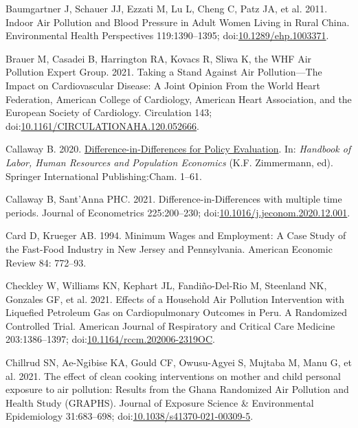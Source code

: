 \documentclass[
  letterpaper,
  DIV=11,
  numbers=noendperiod]{scrartcl}
\newlength{\cslhangindent}
\newlength{\cslentryspacingunit} %
\newenvironment{CSLReferences}[2] %
 {%
  \setlength{\parindent}{0pt}
  \ifodd #1
  \let\oldpar\par
  \def\par{\hangindent=\cslhangindent\oldpar}
  \fi
  \setlength{\parskip}{#2\cslentryspacingunit}
 }%
 {}
\begin{document}
\begin{CSLReferences}{1}{0}
\leavevmode{}%
Baumgartner J, Schauer JJ, Ezzati M, Lu L, Cheng C, Patz JA, et al.
2011. Indoor {Air Pollution} and {Blood Pressure} in {Adult Women
Living} in {Rural China}. Environmental Health Perspectives
119:1390--1395;
doi:\href{https://doi.org/10.1289/ehp.1003371}{10.1289/ehp.1003371}.

\leavevmode{}%
Brauer M, Casadei B, Harrington RA, Kovacs R, Sliwa K, the WHF Air
Pollution Expert Group. 2021. Taking a {Stand Against Air
Pollution}---{The Impact} on {Cardiovascular Disease}: {A Joint Opinion
From} the {World Heart Federation}, {American College} of {Cardiology},
{American Heart Association}, and the {European Society} of
{Cardiology}. Circulation 143;
doi:\href{https://doi.org/10.1161/CIRCULATIONAHA.120.052666}{10.1161/CIRCULATIONAHA.120.052666}.

\leavevmode{}%
Callaway B. 2020.
\href{https://doi.org/10.1007/978-3-319-57365-6_352-1}{Difference-in-{Differences}
for {Policy Evaluation}}. In: \emph{Handbook of {Labor}, {Human
Resources} and {Population Economics}} (K.F. Zimmermann, ed). Springer
International Publishing:Cham. 1--61.

\leavevmode{}%
Callaway B, Sant'Anna PHC. 2021. Difference-in-{Differences} with
multiple time periods. Journal of Econometrics 225:200--230;
doi:\href{https://doi.org/10.1016/j.jeconom.2020.12.001}{10.1016/j.jeconom.2020.12.001}.

\leavevmode{}%
Card D, Krueger AB. 1994. Minimum {Wages} and {Employment}: {A Case
Study} of the {Fast-Food Industry} in {New Jersey} and {Pennsylvania}.
American Economic Review 84: 772--93.

\leavevmode{}%
Checkley W, Williams KN, Kephart JL, Fandiño-Del-Rio M, Steenland NK,
Gonzales GF, et al. 2021. Effects of a {Household Air Pollution
Intervention} with {Liquefied Petroleum Gas} on {Cardiopulmonary
Outcomes} in {Peru}. {A Randomized Controlled Trial}. American Journal
of Respiratory and Critical Care Medicine 203:1386--1397;
doi:\href{https://doi.org/10.1164/rccm.202006-2319OC}{10.1164/rccm.202006-2319OC}.

\leavevmode{}%
Chillrud SN, Ae-Ngibise KA, Gould CF, Owusu-Agyei S, Mujtaba M, Manu G,
et al. 2021. The effect of clean cooking interventions on mother and
child personal exposure to air pollution: Results from the {Ghana
Randomized Air Pollution} and {Health Study} ({GRAPHS}). Journal of
Exposure Science \& Environmental Epidemiology 31:683--698;
doi:\href{https://doi.org/10.1038/s41370-021-00309-5}{10.1038/s41370-021-00309-5}.


\end{CSLReferences}
\end{document}
